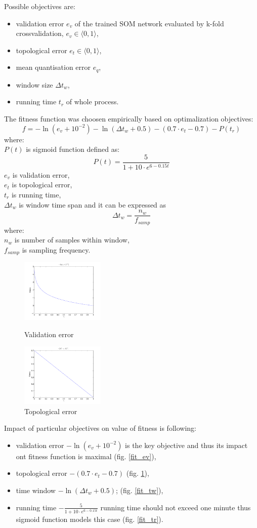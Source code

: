 \documentclass[a4paper,jurnal]{IEEEtran}
\begin{document}
Possible objectives are:%
\begin{itemize}
	\item validation error $ e_v $ of the trained SOM network evaluated by k-fold
	crossvalidation, $ e_v \in \langle 0, 1 \rangle $,
	\item topological error $ e_t \in \langle 0, 1 \rangle $,
	\item mean quantisation error $ e_q $,
	\item window size $ \Delta t_w $,
	\item running time $ t_r $ of whole process.
\end{itemize}
The fitness function was choosen empirically based on optimalization objectives:
\[ f = -\ln(e_v+10^{-2 }) - \ln(\Delta t_w+0.5) - (0.7\cdot e_t-0.7) - P(t_r) \]
where:\\
$ P(t) $ is sigmoid function defined as:
\[ P(t) = \frac{5}{1+10\cdot e^{6-0.15t}} \]
$ e_v $ is validation error,\\
$ e_t $ is topological error,\\
$ t_r $ is running time,\\
$ \Delta t_w $ is window time span and it can be expressed as 
\[  \Delta t_w = \frac{n_w}{f_{samp}}  \]
where:\\
$ n_w $ is number of samples within window,\\
$ f_{samp} $ is sampling frequency.
\\
\begin{figure}[h] %
	\centering
	\parbox{40mm}{
		\includegraphics[width=40mm]{fit_ev}
		\caption{Validation error}
		\label{fit_ev}
	}
	\qquad
	\parbox{40mm}{
		\includegraphics[width=40mm]{fit_et}
		\caption{Topological error}
		\label{fit_et}
	}
\end{figure}

Impact of particular objectives on value of fitness is following:
\begin{itemize}
	\item validation error $ -\ln(e_v+10^{-2 }) $ is the key objective and thus its impact
	ont fitness function is maximal (fig. \ref{fit_ev}),
	\item topological error $ -(0.7\cdot e_t-0.7) $ (fig. \ref{fit_et}),
	\item time window $ -\ln(\Delta t_w+0.5) $; (fig. \ref{fit_tw}),
	\item running time $ -\frac{5}{1+10\cdot e^{6-0.15t}} $ running
	time should not exceed one minute thus sigmoid function models this case (fig.
	 \ref{fit_tr}).
\end{itemize}
\end{document}
